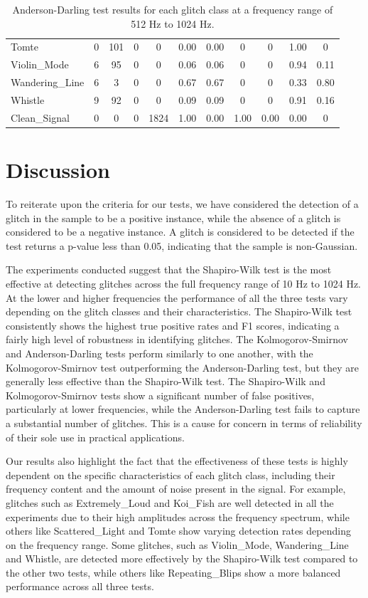 \documentclass[12pt]{article}
\begin{document}
\begin{table}[H]
\begin{tabular}{lcccccccccc}
  Tomte & 0 & 101 & 0 & 0 & 0.00 & 0.00 & 0 & 0 & 1.00 & 0 \\
  Violin\_Mode & 6 & 95 & 0 & 0 & 0.06 & 0.06 & 0 & 0 & 0.94 & 0.11 \\
  Wandering\_Line & 6 & 3 & 0 & 0 & 0.67 & 0.67 & 0 & 0 & 0.33 & 0.80 \\
  Whistle & 9 & 92 & 0 & 0 & 0.09 & 0.09 & 0 & 0 & 0.91 & 0.16 \\
  Clean\_Signal & 0 & 0 & 0 & 1824 & 1.00 & 0.00 & 1.00 & 0.00 & 0.00 & 0 \\
  \bottomrule
  \end{tabular}
  \caption{Anderson-Darling test results for each glitch class at a frequency range of 512 Hz to 1024 Hz.}
  \label{tab:ad_high_frequency_results}
\end{table}

\section{Discussion}\label{Discussion}

\noindent To reiterate upon the criteria for our tests, we have considered the detection of a glitch in the sample to be a positive instance, while the absence of a glitch is considered to be a negative instance. A glitch is considered to be detected if the test returns a p-value less than 0.05, indicating that the sample is non-Gaussian.

\medskip
\noindent The experiments conducted suggest that the Shapiro-Wilk test is the most effective at detecting glitches across the full frequency range of 10 Hz to 1024 Hz. At the lower and higher frequencies the performance of all the three tests vary depending on the glitch classes and their characteristics. The Shapiro-Wilk test consistently shows the highest true positive rates and F1 scores, indicating a fairly high level of robustness in identifying glitches. The Kolmogorov-Smirnov and Anderson-Darling tests perform similarly to one another, with the Kolmogorov-Smirnov test outperforming the Anderson-Darling test, but they are generally less effective than the Shapiro-Wilk test. The Shapiro-Wilk and Kolmogorov-Smirnov tests show a significant number of false positives, particularly at lower frequencies, while the Anderson-Darling test fails to capture a substantial number of glitches. This is a cause for concern in terms of reliability of their sole use in practical applications.

\medskip
\noindent Our results also highlight the fact that the effectiveness of these tests is highly dependent on the specific characteristics of each glitch class, including their frequency content and the amount of noise present in the signal. For example, glitches such as Extremely\_Loud and Koi\_Fish are well detected in all the experiments due to their high amplitudes across the frequency spectrum, while others like Scattered\_Light and Tomte show varying detection rates depending on the frequency range. Some glitches, such as Violin\_Mode, Wandering\_Line and Whistle, are detected more effectively by the Shapiro-Wilk test compared to the other two tests, while others like Repeating\_Blips show a more balanced performance across all three tests.
\end{document}
